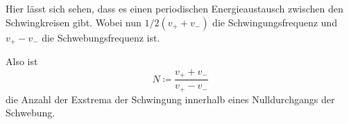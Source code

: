 Hier lässt sich sehen, dass es einen periodischen Energieaustausch zwischen den Schwingkreisen gibt. 
Wobei nun $1/2(v_+ + v_-)$ die Schwingungsfrequenz und $v_+ - v_-$ die Schwebungsfrequenz ist.\cite{V355}

Also ist 
\begin{equation}
    \label{eq:exstrema}
    N \coloneq \frac{v_+ + v_-}{v_+ - v_-}
\end{equation}
die Anzahl der Exstrema der Schwingung innerhalb eines Nulldurchgangs der Schwebung.